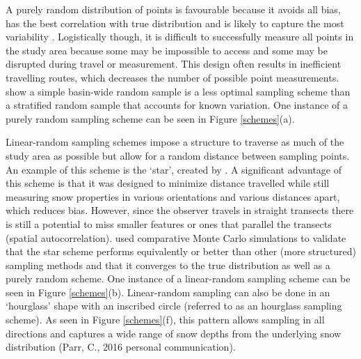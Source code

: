 \documentclass{sfuthesis}
\begin{document}
A purely random distribution of points is favourable because it avoids all bias, has the best correlation with true distribution and is likely to capture the most variability \citep{Kronholm2007, Shea2010}. Logistically though, it is difficult to successfully measure all points in the study area because some may be impossible to access and some may be disrupted during travel or measurement. This design often results in inefficient travelling routes, which decreases the number of possible point measurements. \cite{Elder1991} show a simple basin-wide random sample is a less optimal sampling scheme than a stratified random sample that accounts for known variation. One instance of a purely random sampling scheme can be seen in Figure \ref{schemes}(a). 

Linear-random sampling schemes impose a structure to traverse as much of the study area as possible but allow for a random distance between sampling points. An example of this scheme is the `star', created by \cite{Shea2010}. A significant advantage of this scheme is that it was designed to minimize distance travelled while still measuring snow properties in various orientations and various distances apart, which reduces bias. However, since the observer travels in straight transects there is still a potential to miss smaller features or ones that parallel the transects (spatial autocorrelation). \cite{Shea2010} used comparative Monte Carlo simulations to validate that the star scheme performs equivalently or better than other (more structured) sampling methods and that it converges to the true distribution as well as a purely random scheme. One instance of a linear-random sampling scheme can be seen in Figure \ref{schemes}(b). Linear-random sampling can also be done in an `hourglass' shape with an inscribed circle (referred to as an hourglass sampling scheme). As seen in Figure \ref{schemes}(f), this pattern allows sampling in all directions and captures a wide range of snow depths from the underlying snow distribution (Parr, C., 2016 personal communication).
\end{document}

